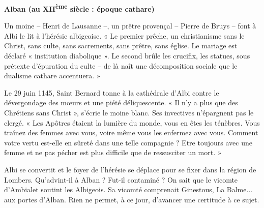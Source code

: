 
\thispagestyle{plain}

\vspace*{12mm}

\begin{center}
    {\Large\bfseries Alban (au XII\textsuperscript{ème} siècle : époque cathare)}
\end{center}

\vspace{18mm}

\noindent
Un moine -- Henri de Lausanne --, un prêtre provençal -- Pierre de
Bruys -- font à Albi le lit à l'hérésie albigeoise. « Le premier
prêche, un christianisme sans le Christ, sans culte, sans sacrements,
sans prêtre, sans église. Le mariage est déclaré « institution
diabolique ». Le second brûle les crucifix, les statues, sous prétexte
d'épuration du culte -- de là naît une décomposition sociale que le
dualisme cathare accentuera. »

\par\vspace{12mm}

\noindent
Le 29 juin 1145, Saint Bernard tonne à la cathédrale d'Albi contre
le dévergondage des mœurs et une piété déliquescente. « Il n'y a
plus que des Chrétiens sans Christ », s'écrie le moine blanc. Ses
invectives n'épargnent pas le clergé. « Les Apôtres étaient la lumière
du monde, vous en êtes les ténèbres. Vous traînez des femmes avec
vous, voire même vous les enfermez avec vous. Comment votre vertu
est-elle en sûreté dans une telle compagnie ? Etre toujours avec
une femme et ne pas pécher est plus difficile que de ressusciter
un mort. »

\par\vspace{12mm}

\noindent
Albi se convertit et le foyer de l'hérésie se déplace pour se fixer
dans la région de Lombers. Qu'advint-il à Alban ? Fut-il contaminé ?
On sait que le vicomte d'Ambialet soutint les Albigeois. Sa vicomté
comprenait Ginestous, La Balme... aux portes d'Alban. Rien ne permet,
à ce jour, d'avancer une certitude à ce sujet.

\vfill
